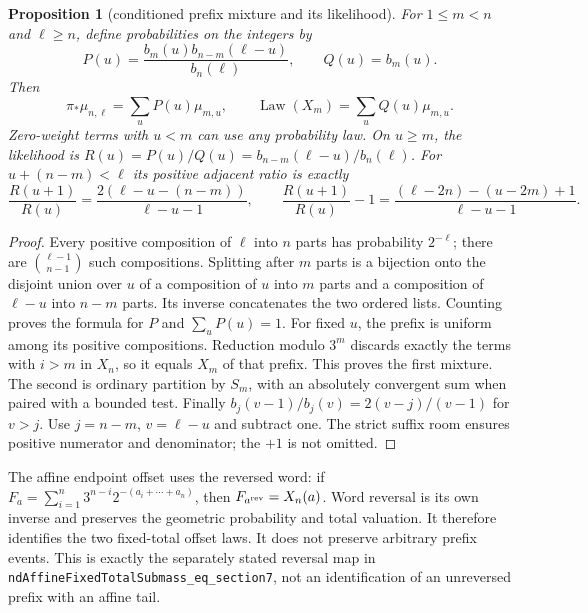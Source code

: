 \documentclass[11pt]{article}
\newtheorem{proposition}{Proposition}
\theoremstyle{remark}\newtheorem{remark}[proposition]{Remark}
\begin{document}
\begin{proposition}[conditioned prefix mixture and its likelihood]
\label{prop:mazur-prefix-mixture}
For $1\le m<n$ and $\ell\ge n$, define probabilities on the integers by
\[
 P(u)=\frac{b_m(u)b_{n-m}(\ell-u)}{b_n(\ell)},\qquad Q(u)=b_m(u).
\]
Then
\begin{equation}
 \pi_*\mu_{n,\ell}=\sum_uP(u)\mu_{m,u},\qquad
 \operatorname{Law}(X_m)=\sum_uQ(u)\mu_{m,u}.
 \label{eq:mazur-prefix-mixture}
\end{equation}
Zero-weight terms with $u<m$ can use any probability law.
On $u\ge m$, the likelihood is
$R(u)=P(u)/Q(u)=b_{n-m}(\ell-u)/b_n(\ell)$.
For $u+(n-m)<\ell$ its positive adjacent ratio is exactly
\begin{equation}
 \frac{R(u+1)}{R(u)}
 =\frac{2(\ell-u-(n-m))}{\ell-u-1},\qquad
 \frac{R(u+1)}{R(u)}-1
 =\frac{(\ell-2n)-(u-2m)+1}{\ell-u-1}.
 \label{eq:mazur-adjacent-ratio}
\end{equation}
\end{proposition}
\begin{proof}
Every positive composition of $\ell$ into $n$ parts has probability
$2^{-\ell}$; there are $\binom{\ell-1}{n-1}$ such compositions.
Splitting after $m$ parts is a bijection onto the disjoint union over $u$
of a composition of $u$ into $m$ parts and a composition of $\ell-u$
into $n-m$ parts. Its inverse concatenates the two ordered lists.
Counting proves the formula for $P$ and $\sum_uP(u)=1$.
For fixed $u$, the prefix is uniform among its positive compositions.
Reduction modulo $3^m$ discards exactly the terms with $i>m$ in $X_n$,
so it equals $X_m$ of that prefix. This proves the first mixture.
The second is ordinary partition by $S_m$, with an absolutely
convergent sum when paired with a bounded test.
Finally
$b_j(v-1)/b_j(v)=2(v-j)/(v-1)$ for $v>j$.
Use $j=n-m$, $v=\ell-u$ and subtract one. The strict suffix room
ensures positive numerator and denominator; the $+1$ is not omitted.
\end{proof}

The affine endpoint offset uses the reversed word: if
$F_a=\sum_{i=1}^n3^{n-i}2^{-(a_i+\cdots+a_n)}$, then
$F_{a^{\rm rev}}=X_n(a)$. Word reversal is its own inverse and preserves
the geometric probability and total valuation. It therefore identifies
the two fixed-total offset laws. It does not preserve arbitrary prefix
events. This is exactly the separately stated reversal map in
\texttt{ndAffineFixedTotalSubmass\_eq\_section7}, not an identification
of an unreversed prefix with an affine tail.
\end{document}
